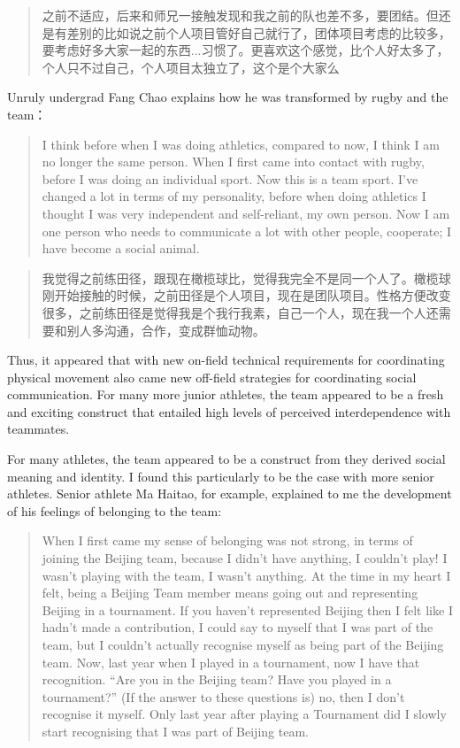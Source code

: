 \begin{CJK}{UTF8}{gbsn}
  \begin{quote}
    之前不适应，后来和师兄一接触发现和我之前的队也差不多，要团结。但还是有差别的比如说之前个人项目管好自己就行了，团体项目考虑的比较多，要考虑好多大家一起的东西...习惯了。更喜欢这个感觉，比个人好太多了，个人只不过自己，个人项目太独立了，这个是个大家么 \\
  \end{quote}

Unruly undergrad Fang Chao explains how he was transformed by rugby and the team：

  \begin{quote}
    I think before when I was doing athletics, compared to now, I think I am no longer the same person.  When I first came into contact with rugby, before I was doing an individual sport.  Now this is a team sport. I've changed a lot in terms of my personality, before when doing athletics I thought I was very independent and self-reliant, my own person.  Now I am one person who needs to communicate a lot with other people, cooperate; I have become a social animal.
  \end{quote}

  \begin{quote}
    我觉得之前练田径，跟现在橄榄球比，觉得我完全不是同一个人了。橄榄球刚开始接触的时候，之前田径是个人项目，现在是团队项目。性格方便改变很多，之前练田径是觉得我是个我行我素，自己一个人，现在我一个人还需要和别人多沟通，合作，变成群恤动物。
  \end{quote}
Thus, it appeared that with new on-field technical requirements for coordinating physical movement also came new off-field strategies for coordinating social communication.   For many more junior athletes, the team appeared to be a fresh and exciting construct that entailed high levels of perceived interdependence with teammates.

For many athletes, the team appeared to be a construct from they derived social meaning and identity. I found this particularly to be the case with more senior athletes.  Senior athlete Ma Haitao, for example, explained to me the development of his feelings of belonging to the team:
    \begin{quote}
      When I first came my sense of belonging was not strong, in terms of joining the Beijing team, because I didn't have anything, I couldn't play! I wasn't playing with the team, I wasn't anything.  At the time in my heart I felt, being a Beijing Team member means going out and representing Beijing in a tournament.  If you haven't represented Beijing then I felt like I hadn't made a contribution, I could say to myself that I was part of the team, but I couldn't actually recognise myself as being part of the Beijing team.  Now, last year when I played in a tournament, now I have that recognition. ``Are you in the Beijing team? Have you played in a tournament?'' (If the answer to these questions is) no, then I don't recognise it myself.  Only last year after playing a Tournament did I slowly start recognising that I was part of Beijing team.
    \end{quote}


\end{CJK}
